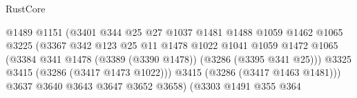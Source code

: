 \begin{lexlean}{RustCore}
\begin{coremodule}
                                                  @1489
                                                  @1151
                                                  (@3401
                                                    @344
                                                    @25
                                                    @27
                                                    @1037
                                                    @1481
                                                    @1488
                                                    @1059
                                                    @1462
                                                    @1065
                                                    @3225
                                                    (@3367
                                                      @342
                                                      @123
                                                      @25
                                                      @11
                                                      @1478
                                                      @1022
                                                      @1041
                                                      @1059
                                                      @1472
                                                      @1065
                                                      (@3384
                                                        @341
                                                        @1478
                                                        (@3389 (@3390 @1478))
                                                        (@3286 (@3395 @341 @25)))
                                                      @3325
                                                      @3415
                                                      (@3286 (@3417 @1473 @1022)))
                                                    @3415
                                                    (@3286 (@3417 @1463 @1481)))
                                                  @3637
                                                  @3640
                                                  @3643
                                                  @3647
                                                  @3652
                                                  @3658)
                                                (@3303
                                                  @1491
                                                  @355
                                                  @364

\end{coremodule}
\end{lexlean}
